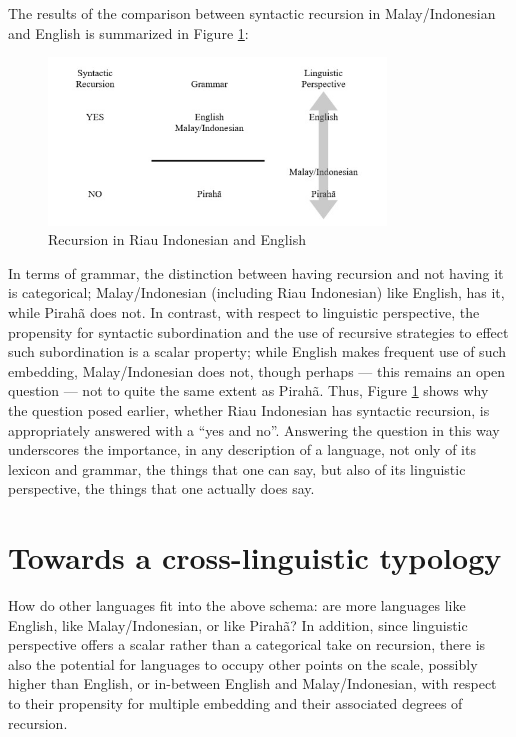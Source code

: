 \documentclass[output=paper,colorlinks,citecolor=brown
]{langscibook}
\begin{document}
The results of the comparison between syntactic recursion in Malay/Indonesian and English is summarized in Figure \ref{fig:gil:fig5}:

\begin{figure}
\centering
\includegraphics[width=0.8\textwidth]{gil_figure5.png}
\caption{\label{fig:gil:fig5}Recursion in Riau Indonesian and English}
\end{figure}

In terms of grammar, the distinction between having recursion and not having it is categorical; Malay/Indonesian (including Riau Indonesian) like English, has it, while Pirahã does not.  In contrast, with respect to linguistic perspective, the propensity for syntactic subordination and the use of recursive strategies to effect such subordination is a scalar property; while English makes frequent use of such embedding, Malay/Indonesian does not, though perhaps — this remains an open question — not to quite the same extent as Pirahã.  Thus, Figure \ref{fig:gil:fig5} shows why the question posed earlier, whether Riau Indonesian has syntactic recursion, is appropriately answered with a ``yes and no''.  Answering the question in this way underscores the importance, in any description of a language, not only of its lexicon and grammar, the things that one can say, but also of its linguistic perspective, the things that one actually does say.

\section{Towards a cross-linguistic typology}

How do other languages fit into the above schema: are more languages like English, like Malay/Indonesian, or like Pirahã?  In addition, since linguistic perspective offers a scalar rather than a categorical take on recursion, there is also the potential for languages to occupy other points on the scale, possibly higher than English, or in-between English and Malay/Indonesian, with respect to their propensity for multiple embedding and their associated degrees of recursion.
\end{document}
